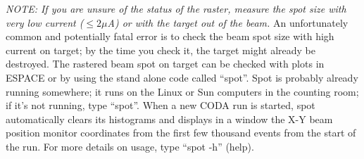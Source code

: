 {\it NOTE:  If you are unsure of the status of the raster,
measure the spot size with very low current ($\le 2 \mu$A) or with
the target out of the beam.}  An unfortunately common and 
potentially fatal error 
is to check the beam spot size with high current on target; by
the time you check it, the target might already be destroyed.
The rastered beam spot on target can be checked with
plots in ESPACE or by using the stand alone code called ``spot''.
Spot is probably already running somewhere; it runs on the 
Linux or Sun computers in the counting room; if it's not
running, type ``spot''.  When a new CODA run is started,
spot automatically clears its histograms and displays 
in a window the X-Y beam position monitor
coordinates from the first few thousand events from the
start of the run.  
For more details on usage, type ``spot -h'' (help).


%
%
%
